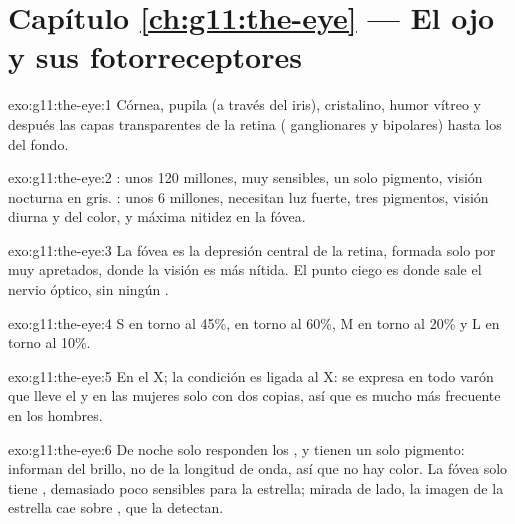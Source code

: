 \section*{Capítulo \ref{ch:g11:the-eye} --- El ojo y sus fotorreceptores}

\begin{solution}{exo:g11:the-eye:1}
Córnea, pupila (a través del iris), cristalino, humor vítreo y después
las capas transparentes de la retina ( ganglionares y bipolares)
hasta los  del fondo.
\end{solution}

\begin{solution}{exo:g11:the-eye:2}
: unos 120 millones, muy sensibles, un solo pigmento, visión
nocturna en gris. : unos 6 millones, necesitan luz fuerte, tres
pigmentos, visión diurna y del color, y máxima nitidez en la fóvea.
\end{solution}

\begin{solution}{exo:g11:the-eye:3}
La fóvea es la depresión central de la retina, formada solo por 
muy apretados, donde la visión es más nítida. El punto ciego es donde
sale el nervio óptico, sin ningún .
\end{solution}

\begin{solution}{exo:g11:the-eye:4}
 S en torno al 45\%,  en torno al 60\%,  M en torno
al 20\% y  L en torno al 10\%.
\end{solution}

\begin{solution}{exo:g11:the-eye:5}
En el  X; la condición es  ligada al X: se expresa en
todo varón que lleve el  y en las mujeres solo con dos copias, así
que es mucho más frecuente en los hombres.
\end{solution}

\begin{solution}{exo:g11:the-eye:6}
De noche solo responden los , y tienen un solo pigmento:
informan del brillo, no de la longitud de onda, así que no hay color.
La fóvea solo tiene , demasiado poco sensibles para la estrella;
mirada de lado, la imagen de la estrella cae sobre , que la
detectan.
\end{solution}

